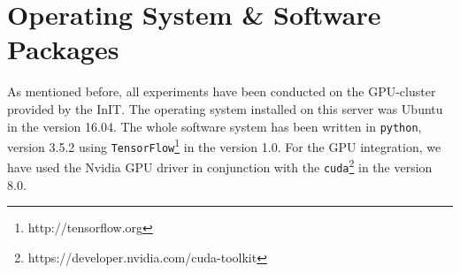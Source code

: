 \section{Operating System \& Software Packages}
\label{software_system:softwar_packages}
As mentioned before, all experiments have been conducted on the GPU-cluster provided by the InIT. The operating system installed on this server was Ubuntu in the version 16.04. The whole software system has been written in \texttt{python}, version 3.5.2 using \texttt{TensorFlow}\footnote{http://tensorflow.org} in the version 1.0. For the GPU integration, we have used the Nvidia GPU driver in conjunction with the \texttt{cuda}\footnote{https://developer.nvidia.com/cuda-toolkit} in the version 8.0.
